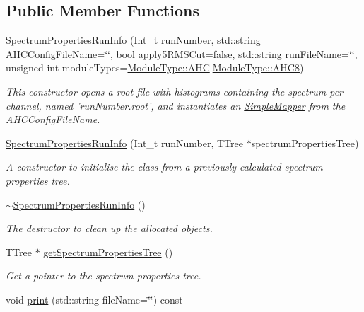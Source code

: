 \subsection*{Public Member Functions}
\begin{DoxyCompactItemize}
\item 
\hyperlink{class_spectrum_properties_run_info_a21d9494b3f2b982c546c240375fdc89b}{Spectrum\-Properties\-Run\-Info} (Int\-\_\-t run\-Number, std\-::string A\-H\-C\-Config\-File\-Name=\char`\"{}\char`\"{}, bool apply5\-R\-M\-S\-Cut=false, std\-::string run\-File\-Name=\char`\"{}\char`\"{}, unsigned int module\-Types=\hyperlink{class_module_type_aab41c936717bfb248a8bf1f38138db0b}{Module\-Type\-::\-A\-H\-C}$|$\hyperlink{class_module_type_a9cbd6a48fabe66ed9d47d23e53d8c9b9}{Module\-Type\-::\-A\-H\-C8})
\begin{DoxyCompactList}\small\item\em This constructor opens a root file with histograms containing the spectrum per channel, named 'run\-Number.\-root', and instantiates an \hyperlink{class_simple_mapper}{Simple\-Mapper} from the A\-H\-C\-Config\-File\-Name. \end{DoxyCompactList}\item 
\hyperlink{class_spectrum_properties_run_info_a282a3cf9cc345986c7e9852b8e8a23ec}{Spectrum\-Properties\-Run\-Info} (Int\-\_\-t run\-Number, T\-Tree $\ast$spectrum\-Properties\-Tree)
\begin{DoxyCompactList}\small\item\em A constructor to initialise the class from a previously calculated spectrum properties tree. \end{DoxyCompactList}\item 
\hyperlink{class_spectrum_properties_run_info_a34cac3093acb09c6603bbbe941a1e496}{$\sim$\-Spectrum\-Properties\-Run\-Info} ()
\begin{DoxyCompactList}\small\item\em The destructor to clean up the allocated objects. \end{DoxyCompactList}\item 
T\-Tree $\ast$ \hyperlink{class_spectrum_properties_run_info_aca0dfbac309a9619d04ce536855a89a2}{get\-Spectrum\-Properties\-Tree} ()
\begin{DoxyCompactList}\small\item\em Get a pointer to the spectrum properties tree. \end{DoxyCompactList}\item 
void \hyperlink{class_spectrum_properties_run_info_a585bf973ed2708d8095ad7510cb67724}{print} (std\-::string file\-Name=\char`\"{}\char`\"{}) const 

\end{DoxyCompactItemize}
